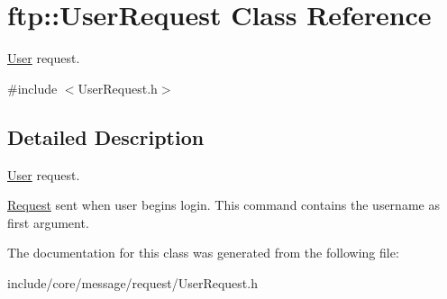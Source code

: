 \hypertarget{classftp_1_1_user_request}{\section{ftp\-:\-:User\-Request Class Reference}
\label{classftp_1_1_user_request}
}


\hyperlink{structftp_1_1_user}{User} request.  




{\ttfamily \#include $<$User\-Request.\-h$>$}



\subsection{Detailed Description}
\hyperlink{structftp_1_1_user}{User} request. 

\hyperlink{classftp_1_1_request}{Request} sent when user begins login. This command contains the username as first argument. 

The documentation for this class was generated from the following file\-:\begin{DoxyCompactItemize}
\item 
include/core/message/request/User\-Request.\-h\end{DoxyCompactItemize}

